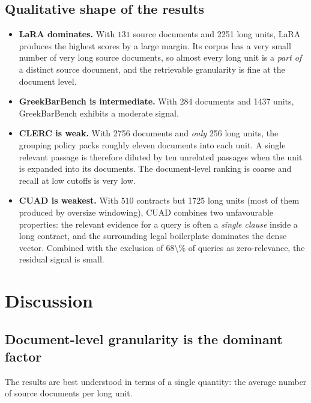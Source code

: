 \documentclass[11pt,a4paper]{article}
\begin{document}
\subsection{Qualitative shape of the results}
\begin{itemize}[leftmargin=1.5em,itemsep=0.15em]
  \item \textbf{LaRA dominates.} With $131$ source documents and
    \num{2251} long units, LaRA produces the highest scores by a
    large margin. Its corpus has a very small number of very long
    source documents, so almost every long unit is a \emph{part of}
    a distinct source document, and the retrievable granularity is
    fine at the document level.
  \item \textbf{GreekBarBench is intermediate.} With $284$ documents
    and \num{1437} units, GreekBarBench exhibits a moderate
    signal.
  \item \textbf{CLERC is weak.} With \num{2756} documents and
    \emph{only} \num{256} long units, the grouping policy packs
    roughly eleven documents into each unit. A single relevant
    passage is therefore diluted by ten unrelated passages when
    the unit is expanded into its documents. The document-level
    ranking is coarse and recall at low cutoffs is very low.
  \item \textbf{CUAD is weakest.} With $510$ contracts but
    \num{1725} long units (most of them produced by oversize
    windowing), CUAD combines two unfavourable properties: the
    relevant evidence for a query is often a \emph{single clause}
    inside a long contract, and the surrounding legal boilerplate
    dominates the dense vector. Combined with the exclusion of
    \num{68\%} of queries as zero-relevance, the residual signal
    is small.
\end{itemize}

\section{Discussion}\label{sec:discussion}

\subsection{Document-level granularity is the dominant factor}
The results are best understood in terms of a single quantity: the
average number of source documents per long unit.
\end{document}
